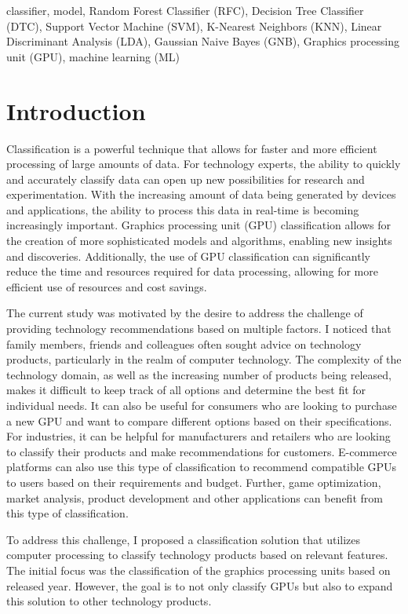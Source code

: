 \documentclass[conference,onecolumn]{IEEEtran}
\begin{document}
\begin{IEEEkeywords}
classifier, model, Random Forest Classifier (RFC), Decision Tree Classifier (DTC), Support Vector Machine (SVM), K-Nearest Neighbors (KNN), Linear Discriminant Analysis (LDA), Gaussian Naive Bayes (GNB), Graphics processing unit (GPU), machine learning (ML)
\end{IEEEkeywords}


\newpage
\section{Introduction}
Classification is a powerful technique that allows for faster and more efficient processing of large amounts of data. For technology experts, the ability to quickly and accurately classify data can open up new possibilities for research and experimentation. With the increasing amount of data being generated by devices and applications, the ability to process this data in real-time is becoming increasingly important. Graphics processing unit (GPU) classification allows for the creation of more sophisticated models and algorithms, enabling new insights and discoveries. Additionally, the use of GPU classification can significantly reduce the time and resources required for data processing, allowing for more efficient use of resources and cost savings\cite{C0}.

The current study was motivated by the desire to address the challenge of providing technology recommendations based on multiple factors. I noticed that family members, friends and colleagues often sought advice on technology products, particularly in the realm of computer technology. The complexity of the technology domain, as well as the increasing number of products being released, makes it difficult to keep track of all options and determine the best fit for individual needs. It can also be useful for consumers who are looking to purchase a new GPU and want to compare different options based on their specifications. For industries, it can be helpful for manufacturers and retailers who are looking to classify their products and make recommendations for customers. E-commerce platforms can also use this type of classification to recommend compatible GPUs to users based on their requirements and budget. Further, game optimization, market analysis, product development and other applications can benefit from this type of classification\cite{C01}.

To address this challenge, I proposed a classification solution that utilizes computer processing to classify technology products based on relevant features. The initial focus was the classification of the graphics processing units based on released year. However, the goal is to not only classify GPUs but also to expand this solution to other technology products.
\end{document}
